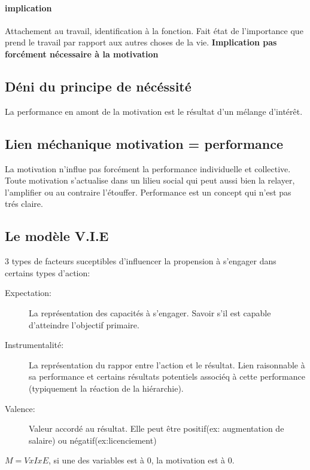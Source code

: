 \documentclass[11pt]{article} %
\begin{document}
		\paragraph{implication} Attachement au travail, identification à la fonction. Fait état de l'importance
		que prend le travail par rapport aux autres choses de la vie. \textbf{Implication pas forcément 
		nécessaire à la motivation}
	\subsection{Déni du principe de nécéssité}
		La performance en amont de la motivation est le résultat d'un mélange d'intérêt.
	\subsection{Lien méchanique motivation = performance}
		La motivation n'influe pas forcément la performance individuelle et collective. Toute motivation 
		s'actualise dans un lilieu social qui peut aussi bien la relayer, l'amplifier ou au contraire l'étouffer. 
		Performance est un concept qui n'est pas trés claire.
	\subsection{Le modèle V.I.E}
		3 types de facteurs suceptibles d'influencer la propension à s'engager dans certains types d'action:
		\begin{description}
			\item[Expectation: ] La représentation des capacités à s'engager. Savoir s'il est capable d'atteindre 
			l'objectif primaire. 
			\item[Instrumentalité: ] La représentation du rappor entre l'action et le résultat. Lien raisonnable 
			à sa performance et certains résultats potentiels associéq à cette performance (typiquement la 
			réaction de la hiérarchie).
			\item[Valence: ] Valeur accordé au résultat. Elle peut être positif(ex: augmentation de salaire) ou
			négatif(ex:licenciement)
		\end{description}
		$M=VxIxE$, si une des variables est à 0, la motivation est à 0. 
\end{document}
